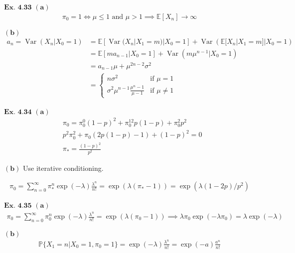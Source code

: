 \documentclass{article}
\begin{document}
\vspace{0.2in}
${\textbf{Ex. 4.33}}$
$\mathbf{(a)}$
\begin{align*}
\pi_{0} = 1 \iff \mu\leq 1 \text{ and } \mu>1 \implies \mathbb{E}[X_n] \rightarrow \infty
\end{align*}

$\mathbf{(b)}$
\begin{align*}
a_n = \operatorname{Var}(X_n|X_0=1) &= \mathbb{E}[\operatorname{Var}(X_n|X_1=m)|X_0=1] + \operatorname{Var}(\mathbb{E}[X_n|X_1=m]|X_0=1)\\
&= \mathbb{E}[ma_{n-1}|X_0=1] + \operatorname{Var}(m\mu^{n-1}|X_0=1)\\
&= a_{n-1}\mu + \mu^{2n-2}\sigma^2\\
&= \left\{\begin{matrix}n\sigma^2&\text{if }\mu=1\\\sigma^2\mu^{n-1}\frac{\mu^{n}-1}{\mu-1}& \text{if }\mu \neq 1\end{matrix}\right.
\end{align*}

\vspace{0.2in}
${\textbf{Ex. 4.34}}$
$\mathbf{(a)}$
\begin{align*}
&\pi_{0} = \pi_0^0(1-p)^2 + \pi_0^12p(1-p) + \pi_0^2p^2\\
& p^2\pi_0^2 + \pi_0(2p(1-p)-1) + (1-p)^2 = 0\\
&\pi_* = \frac{(1-p)^2}{p^2}
\end{align*}

$\mathbf{(b)}$
Use iterative conditioning.

\begin{align*}
\pi_{0} = \sum_{n=0}^{\infty}\pi_*^{n}\exp(-\lambda)\frac{\lambda^n}{n!} = \exp(\lambda(\pi_*-1)) = \exp(\lambda(1-2p)/p^2)
\end{align*}

\vspace{0.2in}
${\textbf{Ex. 4.35}}$
$\mathbf{(a)}$
\begin{align*}
\pi_0 = \sum_{n=0}^{\infty}\pi_0^{n}\exp(-\lambda)\frac{\lambda^n}{n!} = \exp(\lambda (\pi_0-1)) \implies \lambda \pi_0\exp(-\lambda \pi_0) = \lambda \exp(-\lambda)
\end{align*}

$\mathbf{(b)}$
\begin{align*}
\mathbb{P}\{X_1=n|X_0=1,\pi_0=1\} = \exp(-\lambda)\frac{\lambda^n}{n!} = \exp(-a)\frac{a^n}{n!}
\end{align*}
\end{document}
